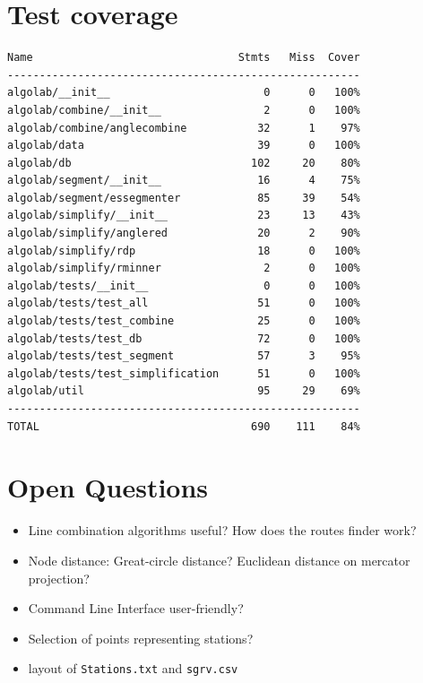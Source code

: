 \documentclass[twoside]{scrartcl}
\begin{document}
\section{Test coverage}
\begin{verbatim}
Name                                Stmts   Miss  Cover
-------------------------------------------------------
algolab/__init__                        0      0   100%
algolab/combine/__init__                2      0   100%
algolab/combine/anglecombine           32      1    97%
algolab/data                           39      0   100%
algolab/db                            102     20    80%
algolab/segment/__init__               16      4    75%
algolab/segment/essegmenter            85     39    54%
algolab/simplify/__init__              23     13    43%
algolab/simplify/anglered              20      2    90%
algolab/simplify/rdp                   18      0   100%
algolab/simplify/rminner                2      0   100%
algolab/tests/__init__                  0      0   100%
algolab/tests/test_all                 51      0   100%
algolab/tests/test_combine             25      0   100%
algolab/tests/test_db                  72      0   100%
algolab/tests/test_segment             57      3    95%
algolab/tests/test_simplification      51      0   100%
algolab/util                           95     29    69%
-------------------------------------------------------
TOTAL                                 690    111    84%
\end{verbatim}

\section{Open Questions}
\begin{itemize}
    \item Line combination algorithms useful? How does the routes finder work?
    \item Node distance: Great-circle distance? Euclidean distance on mercator projection?
    \item Command Line Interface user-friendly?
    \item Selection of points representing stations?
    \item layout of \texttt{Stations.txt} and \texttt{sgrv.csv}
\end{itemize}

\newpage
\end{document}
